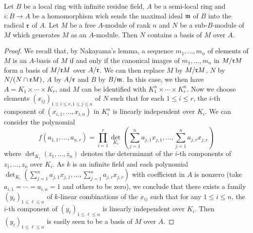\begin{lemma}\label{semilocal ring submodule generating contain basis}
Let $B$ be a local ring with infinite residue field, $A$ be a semi-local ring and $i:B\to A$ be a homomorphism wich sends the maximal ideal $\mathfrak{m}$ of $B$ into the radical $\mathfrak{r}$ of $A$. Let $M$ be a free $A$-module of rank $n$ and $N$ be a sub-$B$-module of $M$ which generates $M$ as an $A$-module. Then $N$ contains a basis of $M$ over $A$.
\end{lemma}
\begin{proof}
We recall that, by Nakayama's lemma, a sequence $m_1,\dots,m_n$ of elements of $M$ is an $A$-basis of $M$ if and only if the canonical images of $m_1,\dots,m_n$ in $M/\mathfrak{r} M$ form a basis of $M/\mathfrak{r} M$ over $A/\mathfrak{r}$. We can then replace $M$ by $M/\mathfrak{r} M$, $N$ by $N/(N\cap\mathfrak{r} M)$, $A$ by $A/\mathfrak{r}$ and $B$ by $B/\mathfrak{m}$. In this case, we then have $A=K_1\times\cdots\times K_r$, and $M$ can be identified with $K_1^n\times\cdots\times K_r^n$. Now we choose elements $(x_{ij})_{1\leq i\leq r,1\leq j\leq n}$ of $N$ such that for each $1\leq i\leq r$, the $i$-th component of $(x_{i,1},\dots,x_{i,n})$ in $K_i^n$ is linearly independent over $K_i$. We can consider the polynomial
\[f(a_{1,1},\dots,a_{n,r})=\prod_{i=1}^{r}\det_{K_i}(\sum_{j=1}^{n}a_{j,1}x_{j,1},\dots,\sum_{j=1}^{n}a_{j,r}x_{j,r})\]
where $\det_{K_i}(z_1,\dots,z_n)$ denotes the determinant of the $i$-th components of $z_1,\dots,z_n$ over $K_i$. As $k$ is an infinite field and each polynomial $\det_{K_i}(\sum_{j=1}^{n}a_{j,1}x_{j,1},\dots,\sum_{j=1}^{n}a_{j,r}x_{j,r})$ with coefficient in $A$ is nonzero (take $a_{i,1}=\cdots=a_{i,n}=1$ and others to be zero), we conclude that there exists a family $(y_\ell)_{1\leq\ell\leq n}$ of $k$-linear combinations of the $x_{ij}$ such that for any $1\leq i\leq n$, the $i$-th component of $(y_\ell)_{1\leq\ell\leq n}$ is linearly independent over $K_i$. Then $(y_\ell)_{1\leq\ell\leq n}$ is easily seen to be a basis of $M$ over $A$.
\end{proof}

